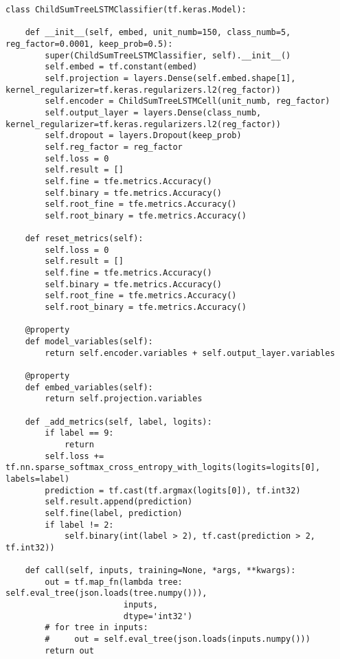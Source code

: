 \begin{lstlisting}[style=app]
class ChildSumTreeLSTMClassifier(tf.keras.Model):

    def __init__(self, embed, unit_numb=150, class_numb=5, reg_factor=0.0001, keep_prob=0.5):
        super(ChildSumTreeLSTMClassifier, self).__init__()
        self.embed = tf.constant(embed)
        self.projection = layers.Dense(self.embed.shape[1], kernel_regularizer=tf.keras.regularizers.l2(reg_factor))
        self.encoder = ChildSumTreeLSTMCell(unit_numb, reg_factor)
        self.output_layer = layers.Dense(class_numb, kernel_regularizer=tf.keras.regularizers.l2(reg_factor))
        self.dropout = layers.Dropout(keep_prob)
        self.reg_factor = reg_factor
        self.loss = 0
        self.result = []
        self.fine = tfe.metrics.Accuracy()
        self.binary = tfe.metrics.Accuracy()
        self.root_fine = tfe.metrics.Accuracy()
        self.root_binary = tfe.metrics.Accuracy()

    def reset_metrics(self):
        self.loss = 0
        self.result = []
        self.fine = tfe.metrics.Accuracy()
        self.binary = tfe.metrics.Accuracy()
        self.root_fine = tfe.metrics.Accuracy()
        self.root_binary = tfe.metrics.Accuracy()

    @property
    def model_variables(self):
        return self.encoder.variables + self.output_layer.variables

    @property
    def embed_variables(self):
        return self.projection.variables

    def _add_metrics(self, label, logits):
        if label == 9:
            return
        self.loss += tf.nn.sparse_softmax_cross_entropy_with_logits(logits=logits[0], labels=label)
        prediction = tf.cast(tf.argmax(logits[0]), tf.int32)
        self.result.append(prediction)
        self.fine(label, prediction)
        if label != 2:
            self.binary(int(label > 2), tf.cast(prediction > 2, tf.int32))

    def call(self, inputs, training=None, *args, **kwargs):
        out = tf.map_fn(lambda tree: self.eval_tree(json.loads(tree.numpy())),
                        inputs,
                        dtype='int32')
        # for tree in inputs:
        #     out = self.eval_tree(json.loads(inputs.numpy()))
        return out


\end{lstlisting}
